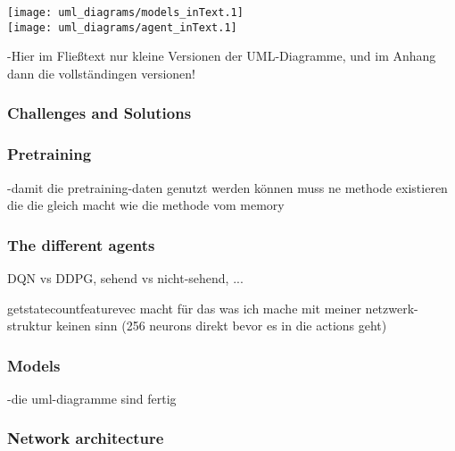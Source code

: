 
\texttt{[image: uml\_diagrams/models\_inText.1]}\\
\newpage
\texttt{[image: uml\_diagrams/agent\_inText.1]}  





-Hier im Fließtext nur kleine Versionen der UML-Diagramme, und im Anhang dann die vollständingen versionen!

\subsubsection{Challenges and Solutions}



\subsubsection{Pretraining}

-damit die pretraining-daten genutzt werden können muss ne methode existieren die die gleich macht wie die methode vom memory

\subsubsection{The different agents}

DQN vs DDPG, sehend vs nicht-sehend, ...  

getstatecountfeaturevec macht für das was ich mache mit meiner netzwerk-struktur keinen sinn (256 neurons direkt bevor es in die actions geht)

\subsubsection{Models}

-die uml-diagramme sind fertig

\subsubsection{Network architecture}

